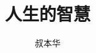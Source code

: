 \documentclass[12pt,oneside]{book}
\begin{document}
\title{人生的智慧}
\author{叔本华}

\makemytitle
\end{document}
